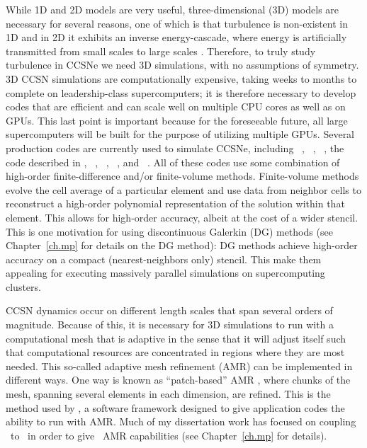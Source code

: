 While 1D and 2D models are very useful,
three-dimensional (3D) models are necessary for several reasons,
one of which is that turbulence is non-existent in 1D and in 2D it
exhibits an inverse energy-cascade, where energy is artificially transmitted
from small scales to large scales \citep{k1967}.
Therefore, to truly study turbulence in CCSNe we need 3D simulations,
with no assumptions of symmetry.
3D CCSN simulations are computationally expensive,
taking weeks to months to complete
on leadership-class supercomputers; it is therefore
necessary to develop codes that are efficient and can scale well on
multiple CPU cores as well as on GPUs.
This last point is important because for the foreseeable future, all
large supercomputers will be built for the purpose of utilizing
multiple GPUs.
Several production codes are currently used to simulate CCSNe, including
\flashx\ \citep{for2000},
\cocov\ \citep{mjd2010},
\zelmani\ \citep{oao2012},
the code described in \citet{ktk2016},
\fornax\ \citep{sdb2019},
\nadafld\ \citep{rjj2019},
\chimera\ \citep{bbh2020},
and \gmunu\ \citep{cht2023}.
All of these codes use some combination of high-order finite-difference
and/or finite-volume methods.
Finite-volume methods \citep[e.g., see][]{l2002} evolve the cell average
of a particular element and use data from neighbor cells to reconstruct
a high-order polynomial representation of the solution within that element.
This allows for high-order accuracy, albeit at the cost of a wider stencil.
This is one motivation for using discontinuous Galerkin (DG) methods
(see Chapter~\ref{ch.mp} for details on the DG method):
DG methods achieve high-order accuracy on a compact (nearest-neighbors only)
stencil.
This make them appealing for executing massively parallel simulations on
supercomputing clusters.

CCSN dynamics occur on different length scales that span several orders of magnitude.  
Because of this, it is necessary for 3D simulations to run with a computational
mesh that is adaptive in the sense that it will adjust itself such that
computational resources are concentrated in regions where they are most needed.
This so-called adaptive mesh refinement (AMR) can be implemented in different
ways.
One way is known as ``patch-based'' AMR , where chunks of the mesh, spanning
several elements in each dimension, are refined.
This is the method used by \amrex\citeme, a software framework designed to give
application codes the ability to run with AMR.
Much of my dissertation work has focused on coupling \thornado\ to \amrex\ in
order to give \thornado\ AMR capabilities (see Chapter~\ref{ch.mp} for details).

